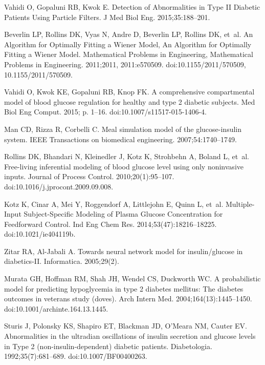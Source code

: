 \documentclass[10pt,letterpaper]{article}
\begin{document}
\begin{thebibliography}{10}
Vahidi O, Gopaluni RB, Kwok E.
\newblock Detection of {Abnormalities} in {Type} {II} {Diabetic} {Patients}
  {Using} {Particle} {Filters}.
\newblock J Med Biol Eng. 2015;35:188--201.

Beverlin LP, Rollins DK, Vyas N, Andre D, Beverlin LP, Rollins DK, et~al.
\newblock An {Algorithm} for {Optimally} {Fitting} a {Wiener} {Model}, {An}
  {Algorithm} for {Optimally} {Fitting} a {Wiener} {Model}.
\newblock Mathematical Problems in Engineering, Mathematical Problems in
  Engineering. 2011;2011, 2011:e570509.
\newblock doi:{10.1155/2011/570509, 10.1155/2011/570509}.

Vahidi O, Kwok KE, Gopaluni RB, Knop FK.
\newblock A comprehensive compartmental model of blood glucose regulation for
  healthy and type 2 diabetic subjects.
\newblock Med Biol Eng Comput. 2015; p. 1--16.
\newblock doi:{10.1007/s11517-015-1406-4}.

Man CD, Rizza R, Corbelli C.
\newblock Meal simulation model of the glucose-insulin system.
\newblock IEEE Transactions on biomedical engineering. 2007;54:1740--1749.

Rollins DK, Bhandari N, Kleinedler J, Kotz K, Strohbehn A, Boland L, et~al.
\newblock Free-living inferential modeling of blood glucose level using only
  noninvasive inputs.
\newblock Journal of Process Control. 2010;20(1):95--107.
\newblock doi:{10.1016/j.jprocont.2009.09.008}.

Kotz K, Cinar A, Mei Y, Roggendorf A, Littlejohn E, Quinn L, et~al.
\newblock Multiple-{Input} {Subject}-{Specific} {Modeling} of {Plasma}
  {Glucose} {Concentration} for {Feedforward} {Control}.
\newblock Ind Eng Chem Res. 2014;53(47):18216--18225.
\newblock doi:{10.1021/ie404119b}.

Zitar RA, Al-Jabali A.
\newblock Towards neural network model for insulin/glucose in diabetics-{II}.
\newblock Informatica. 2005;29(2).

{Murata GH}, {Hoffman RM}, {Shah JH}, {Wendel CS}, {Duckworth WC}.
\newblock A probabilistic model for predicting hypoglycemia in type 2 diabetes
  mellitus: {The} diabetes outcomes in veterans study (doves).
\newblock Arch Intern Med. 2004;164(13):1445--1450.
\newblock doi:{10.1001/archinte.164.13.1445}.

Sturis J, Polonsky KS, Shapiro ET, Blackman JD, O'Meara NM, Cauter EV.
\newblock Abnormalities in the ultradian oscillations of insulin secretion and
  glucose levels in {Type} 2 (non-insulin-dependent) diabetic patients.
\newblock Diabetologia. 1992;35(7):681--689.
\newblock doi:{10.1007/BF00400263}.


\end{thebibliography}
\end{document}
